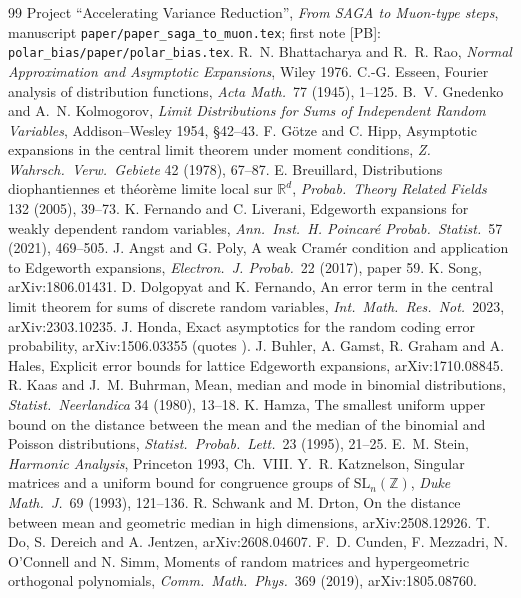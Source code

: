 \documentclass[10pt]{article}
\theoremstyle{definition}
\theoremstyle{remark}
\newcommand{\R}{\mathbb{R}}
\newcommand{\Z}{\mathbb{Z}}
\newcommand{\PB}{\textup{[PB]}}
\begin{document}
\begin{thebibliography}{99}\small
{} Project ``Accelerating Variance Reduction'', \emph{From SAGA to Muon-type steps}, manuscript
\texttt{paper/paper\_saga\_to\_muon.tex}; first note \PB: \texttt{polar\_bias/paper/polar\_bias.tex}.
 R.~N. Bhattacharya and R.~R. Rao, \emph{Normal Approximation and Asymptotic Expansions}, Wiley 1976.
 C.-G. Esseen, Fourier analysis of distribution functions, \emph{Acta Math.}\ 77 (1945), 1--125.
 B.~V. Gnedenko and A.~N. Kolmogorov, \emph{Limit Distributions for Sums of Independent Random Variables},
Addison--Wesley 1954, \S42--43.
 F. G\"otze and C. Hipp, Asymptotic expansions in the central limit theorem under moment conditions,
\emph{Z. Wahrsch.\ Verw.\ Gebiete} 42 (1978), 67--87.
 E. Breuillard, Distributions diophantiennes et th\'eor\`eme limite local sur $\R^d$,
\emph{Probab.\ Theory Related Fields} 132 (2005), 39--73.
 K. Fernando and C. Liverani, Edgeworth expansions for weakly dependent random variables,
\emph{Ann.\ Inst.\ H. Poincar\'e Probab.\ Statist.}\ 57 (2021), 469--505.
 J. Angst and G. Poly, A weak Cram\'er condition and application to Edgeworth expansions,
\emph{Electron.\ J. Probab.}\ 22 (2017), paper 59.
 K. Song, arXiv:1806.01431.
 D. Dolgopyat and K. Fernando, An error term in the central limit theorem for sums of discrete random
variables, \emph{Int.\ Math.\ Res.\ Not.}\ 2023, arXiv:2303.10235.
 J. Honda, Exact asymptotics for the random coding error probability, arXiv:1506.03355 (quotes
\cite[Theorem~20.8]{br}).
 J. Buhler, A. Gamst, R. Graham and A. Hales, Explicit error bounds for lattice Edgeworth expansions,
arXiv:1710.08845.
 R. Kaas and J.~M. Buhrman, Mean, median and mode in binomial distributions, \emph{Statist.\ Neerlandica}
34 (1980), 13--18.
 K. Hamza, The smallest uniform upper bound on the distance between the mean and the median of the
binomial and Poisson distributions, \emph{Statist.\ Probab.\ Lett.}\ 23 (1995), 21--25.
 E.~M. Stein, \emph{Harmonic Analysis}, Princeton 1993, Ch.~VIII.
 Y.~R. Katznelson, Singular matrices and a uniform bound for congruence groups of
$\mathrm{SL}_n(\Z)$, \emph{Duke Math.\ J.}\ 69 (1993), 121--136.
 R. Schwank and M. Drton, On the distance between mean and geometric median in high dimensions,
arXiv:2508.12926.
 T. Do, S. Dereich and A. Jentzen, arXiv:2608.04607.
 F.~D. Cunden, F. Mezzadri, N. O'Connell and N. Simm, Moments of random matrices and hypergeometric
orthogonal polynomials, \emph{Comm.\ Math.\ Phys.}\ 369 (2019), arXiv:1805.08760.
\end{thebibliography}
\end{document}
